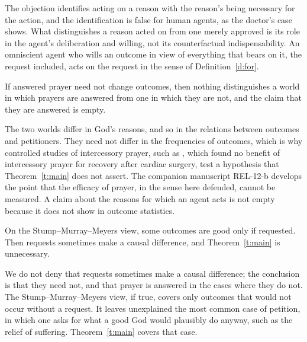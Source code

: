 \documentclass{situationist-preprint}
\begin{document}
\begin{reply}
The objection identifies acting on a reason with the reason's being necessary for the action, and the identification is false for human agents, as the doctor's case shows. What distinguishes a reason acted on from one merely approved is its role in the agent's deliberation and willing, not its counterfactual indispensability. An omniscient agent who wills an outcome in view of everything that bears on it, the request included, acts on the request in the sense of Definition~\ref{d:for}.
\end{reply}

\begin{objection}[Measurement]
If answered prayer need not change outcomes, then nothing distinguishes a world in which prayers are answered from one in which they are not, and the claim that they are answered is empty.
\end{objection}

\begin{reply}
The two worlds differ in God's reasons, and so in the relations between outcomes and petitioners. They need not differ in the frequencies of outcomes, which is why controlled studies of intercessory prayer, such as \citet{Benson2006}, which found no benefit of intercessory prayer for recovery after cardiac surgery, test a hypothesis that Theorem~\ref{t:main} does not assert. The companion manuscript REL-12-b develops the point that the efficacy of prayer, in the sense here defended, cannot be measured. A claim about the reasons for which an agent acts is not empty because it does not show in outcome statistics.
\end{reply}

\begin{objection}
On the Stump–Murray–Meyers view, some outcomes are good only if requested. Then requests sometimes make a causal difference, and Theorem~\ref{t:main} is unnecessary.
\end{objection}

\begin{reply}
We do not deny that requests sometimes make a causal difference; the conclusion is that they need not, and that prayer is answered in the cases where they do not. The Stump–Murray–Meyers view, if true, covers only outcomes that would not occur without a request. It leaves unexplained the most common case of petition, in which one asks for what a good God would plausibly do anyway, such as the relief of suffering. Theorem~\ref{t:main} covers that case.
\end{reply}
\end{document}
